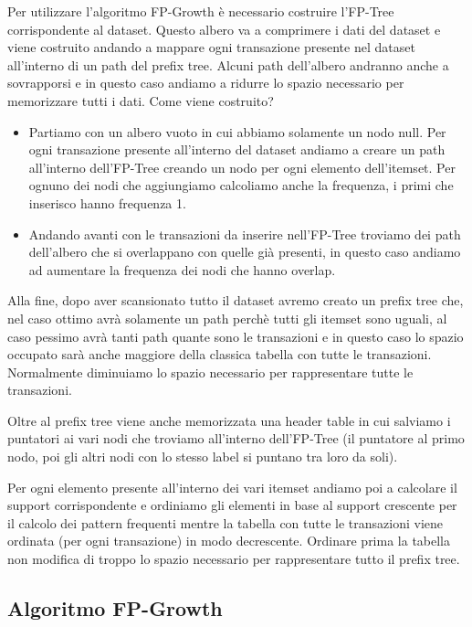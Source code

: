 \documentclass[14pt]{extreport}
\begin{document}
Per utilizzare l'algoritmo FP-Growth è necessario costruire l'FP-Tree corrispondente al dataset.
Questo albero va a comprimere i dati del dataset e viene costruito andando a mappare ogni transazione presente nel dataset all'interno di un path del prefix tree.
Alcuni path dell'albero andranno anche a sovrapporsi e in questo caso andiamo a ridurre lo spazio necessario per memorizzare tutti i dati.
Come viene costruito?
\begin{itemize}
    \item Partiamo con un albero vuoto in cui abbiamo solamente un nodo null. Per ogni transazione presente all'interno del dataset andiamo a creare un path all'interno dell'FP-Tree creando un nodo per ogni elemento dell'itemset. Per ognuno dei nodi che aggiungiamo calcoliamo anche la frequenza, i primi che inserisco hanno frequenza 1.
    \item Andando avanti con le transazioni da inserire nell'FP-Tree troviamo dei path dell'albero che si overlappano con quelle già presenti, in questo caso andiamo ad aumentare la frequenza dei nodi che hanno overlap.
\end{itemize}

Alla fine, dopo aver scansionato tutto il dataset avremo creato un prefix tree che, nel caso ottimo avrà solamente un path perchè tutti gli itemset sono uguali, al caso pessimo avrà tanti path quante sono le transazioni e in questo caso lo spazio occupato sarà anche maggiore della classica tabella con tutte le transazioni. Normalmente diminuiamo lo spazio necessario per rappresentare tutte le transazioni.

Oltre al prefix tree viene anche memorizzata una header table in cui salviamo i puntatori ai vari nodi che troviamo all'interno dell'FP-Tree (il puntatore al primo nodo, poi gli altri nodi con lo stesso label si puntano tra loro da soli).

Per ogni elemento presente all'interno dei vari itemset andiamo poi a calcolare il support corrispondente e ordiniamo gli elementi in base al support crescente per il calcolo dei pattern frequenti mentre la tabella con tutte le transazioni viene ordinata (per ogni transazione) in modo decrescente.
Ordinare prima la tabella non modifica di troppo lo spazio necessario per rappresentare tutto il prefix tree.

\subsection{Algoritmo FP-Growth}
\end{document}
